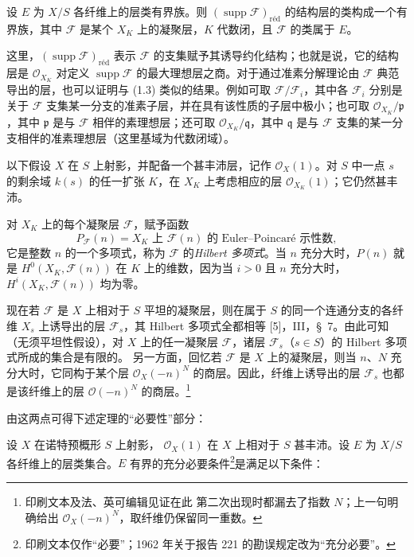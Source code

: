  设 $E$ 为 $X/S$ 各纤维上的层类有界族。则
$(\operatorname{supp}\mathcal F)_{\mathrm{réd}}$ 的结构层的类构成一个有界族，其中 $\mathcal F$ 是某个 $X_K$ 上的凝聚层，$K$ 代数闭，且 $\mathcal F$ 的类属于 $E$。

这里，$(\operatorname{supp}\mathcal F)_{\mathrm{réd}}$ 表示
$\mathcal F$ 的支集赋予其诱导约化结构；也就是说，它的结构层是
$\mathcal O_{X_K}$ 对定义 $\operatorname{supp}\mathcal F$ 的最大理想层之商。对于通过准素分解理论由 $\mathcal F$ 典范导出的层，也可以证明与 (1.3) 类似的结果。例如可取
$\mathcal F/\mathcal F_i$，其中各 $\mathcal F_i$ 分别是关于
$\mathcal F$ 支集某一分支的准素子层，并在具有该性质的子层中极小；也可取
$\mathcal O_{X_K}/\mathfrak p$，其中 $\mathfrak p$ 是与
$\mathcal F$ 相伴的素理想层；还可取
$\mathcal O_{X_K}/\mathfrak q$，其中 $\mathfrak q$ 是与
$\mathcal F$ 支集的某一分支相伴的准素理想层（这里基域为代数闭域）。


以下假设 $X$ 在 $S$ 上射影，并配备一个甚丰沛层，记作
$\mathcal O_X(1)$。对 $S$ 中一点 $s$ 的剩余域 $k(s)$ 的任一扩张
$K$，在 $X_K$ 上考虑相应的层 $\mathcal O_{X_K}(1)$；它仍然甚丰沛。

对 $X_K$ 上的每个凝聚层 $\mathcal F$，赋予函数
\[
P_{\mathcal F}(n)=\text{$X_K$ 上 $\mathcal F(n)$ 的 Euler--Poincaré 示性数},
\]
它是整数 $n$ 的一个多项式，称为 $\mathcal F$ 的\emph{Hilbert 多项式}。当 $n$ 充分大时，$P(n)$ 就是
$H^0(X_K,\mathcal F(n))$ 在 $K$ 上的维数，因为当 $i>0$ 且 $n$ 充分大时，
$H^i(X_K,\mathcal F(n))$ 均为零。

现在若 $\mathcal F$ 是 $X$ 上相对于 $S$ 平坦的凝聚层，则在属于
$S$ 的同一个连通分支的各纤维 $X_s$ 上诱导出的层
$\mathcal F_s$，其 Hilbert 多项式全都相等 [5]，III，\S~7。由此可知（无须平坦性假设），对 $X$ 上的任一凝聚层 $\mathcal F$，诸层
$\mathcal F_s$（$s\in S$）的 Hilbert 多项式所成的集合是有限的。
另一方面，回忆若 $\mathcal F$ 是 $X$ 上的凝聚层，则当 $n$、$N$ 充分大时，它同构于某个层 $\mathcal O_X(-n)^N$ 的商层。因此，纤维上诱导出的层 $\mathcal F_s$ 也都是该纤维上的层
$\mathcal O(-n)^N$ 的商层。\footnote{印刷文本及法、英可编辑见证在此
第二次出现时都漏去了指数 $N$；上一句明确给出
$\mathcal O_X(-n)^N$，取纤维仍保留同一重数。}

由这两点可得下述定理的“必要性”部分：

 设 $X$ 在诺特预概形 $S$ 上射影，
$\mathcal O_X(1)$ 在 $X$ 上相对于 $S$ 甚丰沛。设 $E$ 为
$X/S$ 各纤维上的层类集合。$E$ 有界的充分必要条件\footnote{印刷文本仅作“必要”；1962 年关于报告 221 的勘误规定改为“充分必要”。}是满足以下条件：

